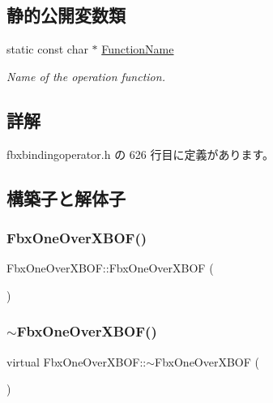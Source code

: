 \subsection*{静的公開変数類}
\begin{DoxyCompactItemize}
\item 
static const char $\ast$ \hyperlink{class_fbx_one_over_x_b_o_f_a17b7276cdb45a9c396edc78b33a6a9c7}{Function\+Name}
\begin{DoxyCompactList}\small\item\em Name of the operation function. \end{DoxyCompactList}\end{DoxyCompactItemize}


\subsection{詳解}


 fbxbindingoperator.\+h の 626 行目に定義があります。



\subsection{構築子と解体子}
\mbox{\label{class_fbx_one_over_x_b_o_f_a597f7c1e603906da75e10dc844744834}} 
\subsubsection{\texorpdfstring{Fbx\+One\+Over\+X\+B\+O\+F()}{FbxOneOverXBOF()}}
{\footnotesize\ttfamily Fbx\+One\+Over\+X\+B\+O\+F\+::\+Fbx\+One\+Over\+X\+B\+OF (\begin{DoxyParamCaption}{ }\end{DoxyParamCaption})}

\mbox{\label{class_fbx_one_over_x_b_o_f_a0e5a38d0274da6566a972b50099e8523}} 
\subsubsection{\texorpdfstring{$\sim$\+Fbx\+One\+Over\+X\+B\+O\+F()}{~FbxOneOverXBOF()}}
{\footnotesize\ttfamily virtual Fbx\+One\+Over\+X\+B\+O\+F\+::$\sim$\+Fbx\+One\+Over\+X\+B\+OF (\begin{DoxyParamCaption}{ }\end{DoxyParamCaption})\hspace{0.3cm}{\ttfamily [virtual]}}



